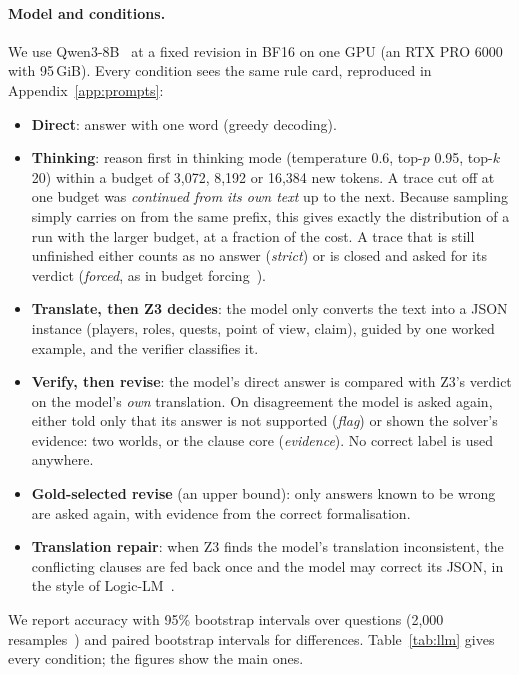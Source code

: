 \documentclass[runningheads]{llncs}
\begin{document}
\paragraph{Model and conditions.}
We use Qwen3-8B~\cite{qwen2025qwen3} at a fixed revision in BF16 on one GPU (an RTX PRO 6000 with 95\,GiB). Every
condition sees the same rule card, reproduced in Appendix~\ref{app:prompts}:
\begin{itemize}[leftmargin=1.2em]
\item \textbf{Direct}: answer with one word (greedy decoding).
\item \textbf{Thinking}: reason first in thinking mode (temperature 0.6, top-$p$ 0.95, top-$k$ 20) within a budget of
3,072, 8,192 or 16,384 new tokens. A trace cut off at one budget was \emph{continued from its own text} up to the
next. Because sampling simply carries on from the same prefix, this gives exactly the distribution of a run with the
larger budget, at a fraction of the cost. A trace that is still unfinished either counts as no answer (\emph{strict})
or is closed and asked for its verdict (\emph{forced}, as in budget forcing~\cite{muennighoff2025s1}).
\item \textbf{Translate, then Z3 decides}: the model only converts the text into a JSON instance (players, roles,
quests, point of view, claim), guided by one worked example, and the verifier classifies it.
\item \textbf{Verify, then revise}: the model's direct answer is compared with Z3's verdict on the model's
\emph{own} translation. On disagreement the model is asked again, either told only that its answer is not supported
(\emph{flag}) or shown the solver's evidence: two worlds, or the clause core (\emph{evidence}). No correct label is
used anywhere.
\item \textbf{Gold-selected revise} (an upper bound): only answers known to be wrong are asked again, with evidence
from the correct formalisation.
\item \textbf{Translation repair}: when Z3 finds the model's translation inconsistent, the conflicting clauses are
fed back once and the model may correct its JSON, in the style of Logic-LM~\cite{pan2023logiclm}.
\end{itemize}
We report accuracy with 95\% bootstrap intervals over questions (2,000 resamples~\cite{efron1993bootstrap}) and
paired bootstrap intervals for differences. Table~\ref{tab:llm} gives every condition; the figures show the main ones.
\end{document}
